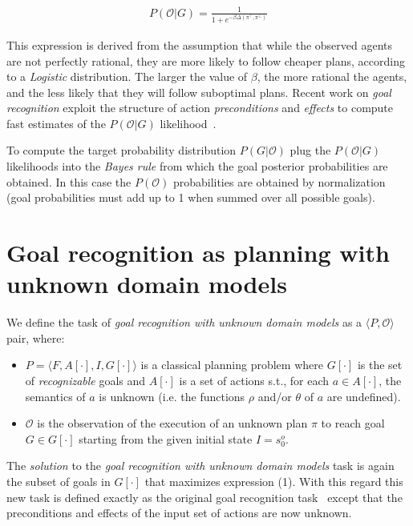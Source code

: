 \documentclass[letterpaper]{article} %
\newcommand{\tup}[1]{{\langle #1 \rangle}}
\begin{document}
\begin{align}
P(\mathcal{O}|G) = \frac{1}{1+e^{-\beta \Delta(\pi^\top,\pi^\bot)}}
\end{align}

This expression is derived from the assumption that while the observed agents are not perfectly rational, they are more likely to follow cheaper plans, according to a {\em Logistic} distribution. The larger the value of $\beta$, the more rational the agents, and the less likely that they will follow suboptimal plans. Recent work on {\em goal recognition} exploit the structure of action {\em preconditions} and {\em effects} to compute fast estimates of the $P(\mathcal{O}|G)$ likelihood~\cite{pereira2017landmark}.

To compute the target probability distribution $P(G|\mathcal{O})$ plug the $P(\mathcal{O}|G)$ likelihoods into the {\em Bayes rule} from which the goal posterior probabilities are obtained. In this case the $P(\mathcal{O})$ probabilities are obtained by normalization (goal probabilities must add up to 1 when summed over all possible goals).



\section{Goal recognition as planning with unknown domain models}
\label{sec:recognition}

We define the task of {\em goal recognition with unknown domain models} as a $\tup{P,\mathcal{O}}$ pair, where:
\begin{itemize}
\item $P=\tup{F,A[\cdot],I,G[\cdot]}$ is a classical planning problem where $G[\cdot]$ is the set of {\em recognizable} goals and $A[\cdot]$ is a set of actions s.t., for each $a\in A[\cdot]$, the semantics of $a$ is unknown (i.e. the functions $\rho$ and/or $\theta$ of $a$ are undefined).
\item $\mathcal{O}$ is the observation of the execution of an unknown plan $\pi$ to reach goal $G\in G[\cdot]$ starting from the given initial state $I=s_0^o$.
\end{itemize}

The {\em solution} to the {\em goal recognition with unknown domain models} task is again the subset of goals in $G[\cdot]$ that maximizes expression (1). With this regard this new task is defined exactly as the original goal recognition task~\cite{ramirez2012plan} except that the preconditions and effects of the input set of actions are now unknown.
\end{document}
